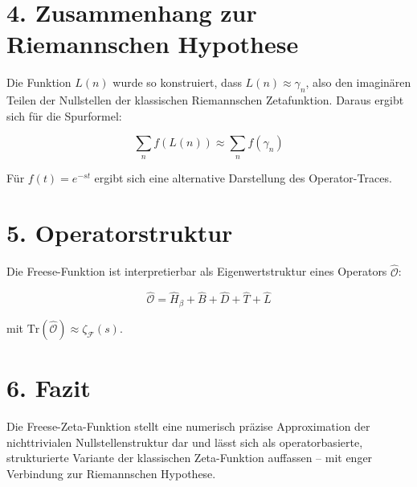 \documentclass[12pt]{article}
\begin{document}
\vspace{1em}

\section*{4. Zusammenhang zur Riemannschen Hypothese}
Die Funktion $L(n)$ wurde so konstruiert, dass $L(n) \approx \gamma_n$, also den imaginären Teilen der Nullstellen der klassischen Riemannschen Zetafunktion. Daraus ergibt sich für die Spurformel:

\begin{equation}
\sum_n f(L(n)) \approx \sum_n f(\gamma_n)
\end{equation}

Für $f(t) = e^{-st}$ ergibt sich eine alternative Darstellung des Operator-Traces.

\vspace{1em}

\section*{5. Operatorstruktur}
Die Freese-Funktion ist interpretierbar als Eigenwertstruktur eines Operators $\hat{\mathcal{O}}$:

\[
\hat{\mathcal{O}} = \hat{H}_\beta + \hat{B} + \hat{D} + \hat{T} + \hat{L}
\]

mit $\text{Tr}(\hat{\mathcal{O}}) \approx \zeta_{\mathcal{F}}(s)$.

\vspace{1em}

\section*{6. Fazit}
Die Freese-Zeta-Funktion stellt eine numerisch präzise Approximation der nichttrivialen Nullstellenstruktur dar und lässt sich als operatorbasierte, strukturierte Variante der klassischen Zeta-Funktion auffassen – mit enger Verbindung zur Riemannschen Hypothese.
\end{document}
